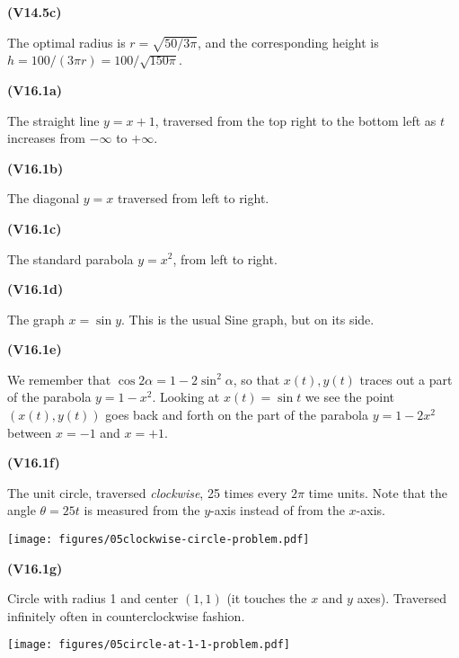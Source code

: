 \documentclass[openany,reqno]{amsbook}
\begin{document}
\begin{trivlist}
\item[{\bf(V14.5c)}]

  The optimal radius is $r = \sqrt{50/3\pi}$, and the corresponding
  height is $h = 100/(3\pi r) = 100/\sqrt{150\pi}$.
  \bigskip

\item[{\bf(V16.1a)}]

  The straight line $y=x+1$, traversed from the top right to the bottom left
  as $t$ increases from $-\infty$ to $+\infty$.
  \bigskip

\item[{\bf(V16.1b)}]

  The diagonal $y=x$ traversed from left to right.
  \bigskip

\item[{\bf(V16.1c)}]

  The standard parabola $y=x^2$, from left to right.
  \bigskip

\item[{\bf(V16.1d)}]

  The graph $x=\sin y$.  This is the usual Sine graph, but on its side.

  \centerline{ }
  \bigskip

\item[{\bf(V16.1e)}]

  We remember that $\cos2\alpha = 1-2\sin^2\alpha$, so that
  $x(t), y(t)$ traces out a part of the parabola $y=1-x^2$.
  Looking at $x(t) = \sin t$ we see the point $(x(t), y(t))$ goes back
  and forth on the part of the parabola $y=1-2x^2$ between $x=-1$
  and $x=+1$.
  \bigskip

\item[{\bf(V16.1f)}]

  The unit circle, traversed \emph{clockwise}, 25 times every $2\pi$ time units.
  Note that the angle $\theta = 25t$ is measured from the $y$-axis instead of from
  the $x$-axis.

  \begin{center}
    \texttt{[image: figures/05clockwise-circle-problem.pdf]}
  \end{center}
  \bigskip

\item[{\bf(V16.1g)}]

  Circle with radius 1 and center $(1,1)$ (it touches the $x$ and $y$ axes).
  Traversed infinitely often in counterclockwise fashion.
  \begin{center}
    \texttt{[image: figures/05circle-at-1-1-problem.pdf]}
  \end{center}
  \bigskip


\end{trivlist}
\end{document}
